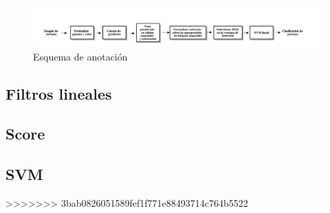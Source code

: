 \begin{figure}[h]
  \centering
   \includegraphics[width=1\textwidth]{Figuras/hog-procedure.png}
   \caption{Esquema de anotación}
   \label{fig:anota}
\end{figure}

\subsection{Filtros lineales}
\label{subsec:fl}

\subsection{Score}
\label{subsec:score}

\subsection{SVM}
>>>>>>> 3bab0826051589fef1f771e88493714c764b5522
